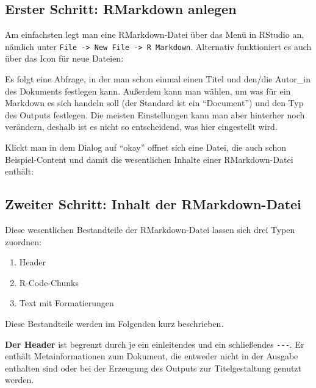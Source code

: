 \documentclass[
]{book}
\begin{document}
\hypertarget{erster-schritt-rmarkdown-anlegen}{%
\subsection{Erster Schritt: RMarkdown anlegen}\label{erster-schritt-rmarkdown-anlegen}}

Am einfachsten legt man eine RMarkdown-Datei über das Menü in RStudio an, nämlich unter \texttt{File\ -\textgreater{}\ New\ File\ -\textgreater{}\ R\ Markdown}. Alternativ funktioniert es auch über das Icon für neue Dateien:

Es folgt eine Abfrage, in der man schon einmal einen Titel und den/die Autor\_in des Dokuments festlegen kann. Außerdem kann man wählen, um was für ein Markdown es sich handeln soll (der Standard ist ein ``Document'') und den Typ des Outputs festlegen. Die meisten Einstellungen kann man aber hinterher noch verändern, deshalb ist es nicht so entscheidend, was hier eingestellt wird.

Klickt man in dem Dialog auf ``okay'' offnet sich eine Datei, die auch schon Beispiel-Content und damit die wesentlichen Inhalte einer RMarkdown-Datei enthält:

\hypertarget{zweiter-schritt-inhalt-der-rmarkdown-datei}{%
\subsection{Zweiter Schritt: Inhalt der RMarkdown-Datei}\label{zweiter-schritt-inhalt-der-rmarkdown-datei}}

Diese wesentlichen Bestandteile der RMarkdown-Datei lassen sich drei Typen zuordnen:

\begin{enumerate}
\def\labelenumi{\arabic{enumi}.}
\item
  Header
\item
  R-Code-Chunks
\item
  Text mit Formatierungen
\end{enumerate}

Diese Bestandteile werden im Folgenden kurz beschrieben.

\textbf{Der Header} ist begrenzt durch je ein einleitendes und ein schließendes \texttt{-\/-\/-}. Er enthält Metainformationen zum Dokument, die entweder nicht in der Ausgabe enthalten sind oder bei der Erzeugung des Outputs zur Titelgestaltung genutzt werden.
\end{document}

